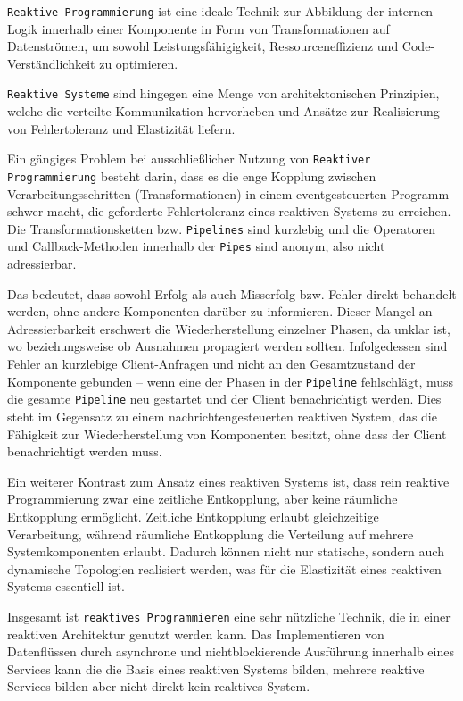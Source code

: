 \verb|Reaktive Programmierung| ist eine ideale Technik zur Abbildung der internen Logik innerhalb einer Komponente in Form von Transformationen
auf Datenströmen, um sowohl Leistungsfähigigkeit, Ressourceneffizienz und Code-Verständlichkeit zu optimieren.

\verb|Reaktive Systeme| sind hingegen eine Menge von architektonischen Prinzipien, welche die verteilte Kommunikation hervorheben und
Ansätze zur Realisierung von Fehlertoleranz und Elastizität liefern.

Ein gängiges Problem bei ausschließlicher Nutzung von \verb|Reaktiver Programmierung| besteht darin, dass es die enge Kopplung
zwischen Verarbeitungsschritten (Transformationen) in einem eventgesteuerten Programm schwer macht, die geforderte Fehlertoleranz
eines reaktiven Systems zu erreichen.
Die Transformationsketten bzw. \verb|Pipelines| sind kurzlebig und die Operatoren und Callback-Methoden innerhalb der \verb|Pipes|
sind anonym, also nicht adressierbar.

Das bedeutet, dass sowohl Erfolg als auch Misserfolg bzw. Fehler direkt behandelt werden, ohne andere Komponenten darüber zu informieren.
Dieser Mangel an Adressierbarkeit erschwert die Wiederherstellung einzelner Phasen, da unklar ist, wo beziehungsweise ob Ausnahmen
propagiert werden sollten. Infolgedessen sind Fehler an kurzlebige Client-Anfragen und nicht an den
Gesamtzustand der Komponente gebunden – wenn eine der Phasen in der \verb|Pipeline| fehlschlägt, muss die gesamte \verb|Pipeline| neu
gestartet und der Client benachrichtigt werden. Dies steht im Gegensatz zu einem nachrichtengesteuerten reaktiven System, das
die Fähigkeit zur Wiederherstellung von Komponenten besitzt, ohne dass der Client benachrichtigt werden muss.

Ein weiterer Kontrast zum Ansatz eines reaktiven Systems ist, dass rein reaktive Programmierung zwar eine zeitliche Entkopplung,
aber keine räumliche Entkopplung ermöglicht. Zeitliche Entkopplung erlaubt gleichzeitige Verarbeitung, während räumliche Entkopplung
die Verteilung auf mehrere Systemkomponenten erlaubt. Dadurch können nicht nur statische, sondern auch dynamische Topologien
realisiert werden, was für die Elastizität eines reaktiven Systems essentiell ist.

Insgesamt ist \verb|reaktives Programmieren| eine sehr nützliche Technik, die in einer reaktiven Architektur genutzt werden kann.
Das Implementieren von Datenflüssen durch asynchrone und nichtblockierende Ausführung innerhalb eines Services kann die
die Basis eines reaktiven Systems bilden, mehrere reaktive Services bilden aber nicht direkt kein reaktives System.

